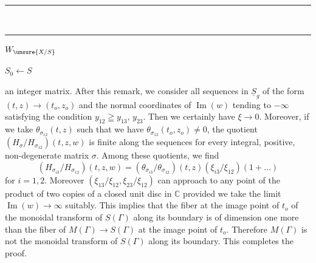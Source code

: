 \begin{center}\rule{3cm}{0.35pt}\\[-0.6ex]\rule{4cm}{0.45pt}\end{center}





$W_{\unsure{X/S}}$

$S_{0}\leftarrow S$


an integer matrix. After this remark, we consider all sequences in $\underline{S}_{g}$ of the form $(t,z)\longrightarrow(t_{o},z_{o})$ and the normal coordinates of $\operatorname{Im}(w)$ tending to $-\infty$ satisfying the condition $y_{12}\geqq y_{13},\,y_{23}$. Then we certainly have $\xi\longrightarrow0$. Moreover, if we take $\theta_{\sigma_{12}}(t,z)$ such that we have $\theta_{\sigma_{12}}(t_{o},z_{o})\neq0$, the quotient $(H_{\sigma}/H_{\sigma_{12}})(t,z,w)$ is finite along the sequences for every integral, positive, non-degenerate matrix $\sigma$. Among these quotients, we find
\[
(H_{\sigma_{i3}}/H_{\sigma_{12}})(t,z,w)=(\theta_{\sigma_{i3}}/\theta_{\sigma_{12}})(t,z)(\xi_{i3}/\xi_{12})(1+\ldots)
\]
for $i=1,2$. Moreover $(\xi_{13}/\xi_{12},\xi_{23}/\xi_{12})$ can approach to any point of the product of two copies of a closed unit disc in $\mathbb C$ provided we take the limit $\operatorname{Im}(w)\longrightarrow\infty$ suitably. This implies that the fiber at the image point of $t_{o}$ of the monoidal transform of $S(\Gamma)$ along its boundary is of dimension one more than the fiber of $M(\Gamma)\longrightarrow S(\Gamma)$ at the image point of $t_{o}$. Therefore $M(\Gamma)$ is not the monoidal transform of $S(\Gamma)$ along its boundary. This completes the proof.


